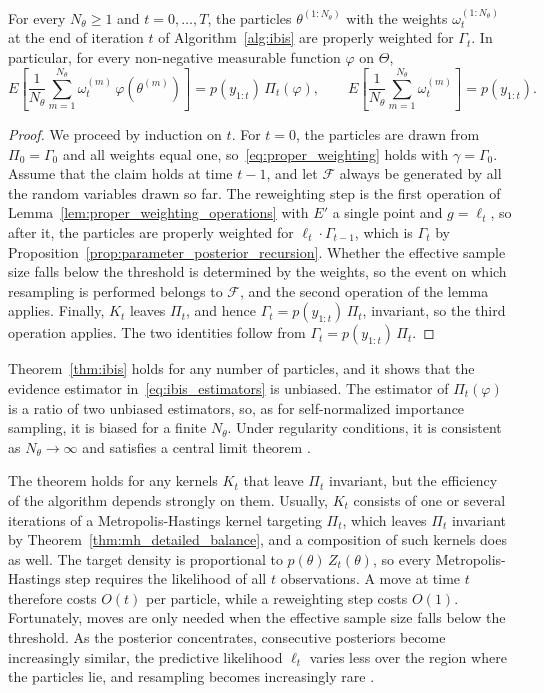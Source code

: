 \begin{theorem}
    \label{thm:ibis}
    For every $N_\theta\ge1$ and $t=0,\ldots,T$, the particles $\theta^{(1:N_\theta)}$ with the weights $\omega_t^{(1:N_\theta)}$ at the end of iteration $t$ of Algorithm~\ref{alg:ibis} are properly weighted for $\Gamma_t$. In particular, for every non-negative measurable function $\varphi$ on $\Theta$,
    \begin{equation}
        E\left[\frac{1}{N_\theta}\sum_{m=1}^{N_\theta}\omega_t^{(m)}\,\varphi(\theta^{(m)})\right] = p(y_{1:t})\,\Pi_t(\varphi), \qquad
        E\left[\frac{1}{N_\theta}\sum_{m=1}^{N_\theta}\omega_t^{(m)}\right] = p(y_{1:t}).
    \end{equation}
\end{theorem}
\begin{proof}
    We proceed by induction on $t$. For $t=0$, the particles are drawn from $\Pi_0 = \Gamma_0$ and all weights equal one, so~\eqref{eq:proper_weighting} holds with $\gamma = \Gamma_0$. Assume that the claim holds at time $t-1$, and let $\mathcal{F}$ always be generated by all the random variables drawn so far. The reweighting step is the first operation of Lemma~\ref{lem:proper_weighting_operations} with $E'$ a single point and $g = \ell_t$, so after it, the particles are properly weighted for $\ell_t\cdot\Gamma_{t-1}$, which is $\Gamma_t$ by Proposition~\ref{prop:parameter_posterior_recursion}. Whether the effective sample size falls below the threshold is determined by the weights, so the event on which resampling is performed belongs to $\mathcal{F}$, and the second operation of the lemma applies. Finally, $K_t$ leaves $\Pi_t$, and hence $\Gamma_t = p(y_{1:t})\,\Pi_t$, invariant, so the third operation applies. The two identities follow from $\Gamma_t = p(y_{1:t})\,\Pi_t$.
\end{proof}

Theorem~\ref{thm:ibis} holds for any number of particles, and it shows that the evidence estimator in~\eqref{eq:ibis_estimators} is unbiased. The estimator of $\Pi_t(\varphi)$ is a ratio of two unbiased estimators, so, as for self-normalized importance sampling, it is biased for a finite $N_\theta$. Under regularity conditions, it is consistent as $N_\theta\to\infty$ and satisfies a central limit theorem \cite{chopin2002sequential,chopin2020smc}.

The theorem holds for any kernels $K_t$ that leave $\Pi_t$ invariant, but the efficiency of the algorithm depends strongly on them. Usually, $K_t$ consists of one or several iterations of a Metropolis-Hastings kernel targeting $\Pi_t$, which leaves $\Pi_t$ invariant by Theorem~\ref{thm:mh_detailed_balance}, and a composition of such kernels does as well. The target density is proportional to $p(\theta)\,Z_t(\theta)$, so every Metropolis-Hastings step requires the likelihood of all $t$ observations. A move at time $t$ therefore costs $O(t)$ per particle, while a reweighting step costs $O(1)$. Fortunately, moves are only needed when the effective sample size falls below the threshold. As the posterior concentrates, consecutive posteriors become increasingly similar, the predictive likelihood $\ell_t$ varies less over the region where the particles lie, and resampling becomes increasingly rare \cite{chopin2002sequential}.

